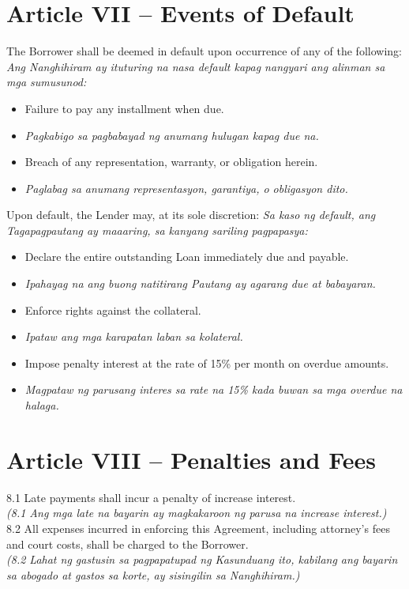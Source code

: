 \documentclass[a4paper,12pt]{article}
\begin{document}
\section*{Article VII – Events of Default}
The Borrower shall be deemed in default upon occurrence of any of the following:
\textit{Ang Nanghihiram ay ituturing na nasa default kapag nangyari ang alinman sa mga sumusunod:}
\begin{itemize}
\item Failure to pay any installment when due.
\item \textit{Pagkabigo sa pagbabayad ng anumang hulugan kapag due na.}
\item Breach of any representation, warranty, or obligation herein.
\item \textit{Paglabag sa anumang representasyon, garantiya, o obligasyon dito.}
\end{itemize}
Upon default, the Lender may, at its sole discretion:
\textit{Sa kaso ng default, ang Tagapagpautang ay maaaring, sa kanyang sariling pagpapasya:}
\begin{itemize}
\item Declare the entire outstanding Loan immediately due and payable.
\item \textit{Ipahayag na ang buong natitirang Pautang ay agarang due at babayaran.}
\item Enforce rights against the collateral.
\item \textit{Ipataw ang mga karapatan laban sa kolateral.}
\item Impose penalty interest at the rate of 15\% per month on overdue amounts.
\item \textit{Magpataw ng parusang interes sa rate na 15\% kada buwan sa mga overdue na halaga.}
\end{itemize}
\section*{Article VIII – Penalties and Fees}
8.1 Late payments shall incur a penalty of increase interest. \\
\textit{(8.1 Ang mga late na bayarin ay magkakaroon ng parusa na increase interest.)}
8.2 All expenses incurred in enforcing this Agreement, including attorney's fees and court costs, shall be charged to the Borrower. \\
\textit{(8.2 Lahat ng gastusin sa pagpapatupad ng Kasunduang ito, kabilang ang bayarin sa abogado at gastos sa korte, ay sisingilin sa Nanghihiram.)}
\end{document}
